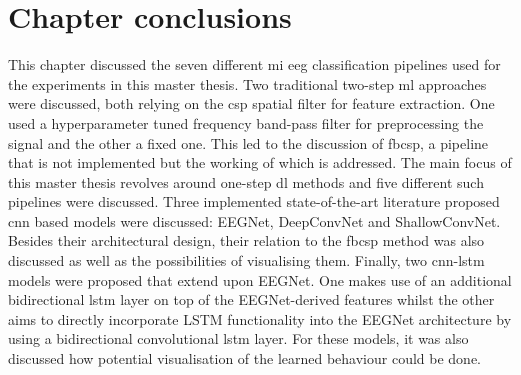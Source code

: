 \section{Chapter conclusions}
\label{sec:offline_bci_summary}

This chapter discussed the seven different \gls{mi} \gls{eeg} classification pipelines used for the experiments in this master thesis.
Two traditional two-step \gls{ml} approaches were discussed, both relying on the \gls{csp} spatial filter for feature extraction.
One used a hyperparameter tuned frequency band-pass filter for preprocessing the signal and the other a fixed one.
This led to the discussion of \gls{fbcsp}, a pipeline that is not implemented but the working of which is addressed.
The main focus of this master thesis revolves around one-step \gls{dl} methods and five different such pipelines were discussed.
Three implemented state-of-the-art literature proposed \gls{cnn} based models were discussed: EEGNet, DeepConvNet and ShallowConvNet.
Besides their architectural design, their relation to the \gls{fbcsp} method was also discussed as well as the possibilities of visualising them.
Finally, two \gls{cnn}-\gls{lstm} models were proposed that extend upon EEGNet.
One makes use of an additional bidirectional \gls{lstm} layer on top of the EEGNet-derived features whilst the other aims to directly incorporate LSTM functionality into the EEGNet architecture by using a bidirectional convolutional \gls{lstm} layer.
For these models, it was also discussed how potential visualisation of the learned behaviour could be done.